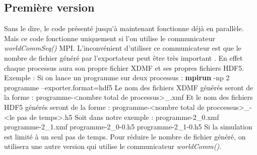 \documentclass[12pt]{article}
\begin{document}
\subsection {Première version}
Sans le dire, le code présenté jusqu'à maintenant fonctionne déjà en parallèle. Mais ce code fonctionne uniquement si l'on utilise le communicateur \emph{worldCommSeq()} MPI. L'inconvénient d'utiliser ce communicateur est que le nombre de fichier généré par l'exportateur peut être très important . En effet chaque processus aura son propre fichier XDMF et ses propres fichiers HDF5.\newline
Exemple : \newline
Si on lance un programme sur deux processus : \textbf{mpirun} -np 2 programme --exporter.format=hdf5\newline
Le nom des fichiers XDMF générés seront de la forme : programme-<nombre total de processus>\_<le rang du processus courant>.xmf\newline
Et le nom des fichiers HDF5 générés seront de la forme : programme-<nombre total de proccessus>\_<le range du precessus courant>-<le pas de temps>.h5\newline
Soit dans notre exemple : \newline
programme-2\_0.xmf\newline
programme-2\_1.xmf\newline
programme-2\_0-0.h5\newline
programme-2\_1-0.h5\newline
Si la simulation est limité à un seul pas de temps.\newline
Pour réduire le nombre de fichier généré, on utilisera une autre version qui utilise le communicateur \emph{worldComm()}.
\end{document}
